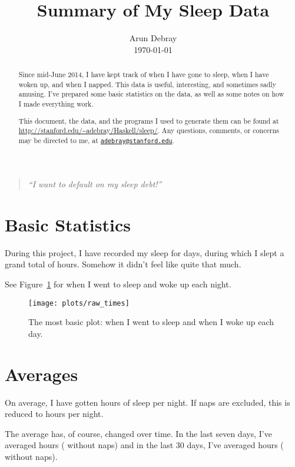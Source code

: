 \documentclass{amsart}
\begin{document}
\title{Summary of My Sleep Data}
\author{Arun Debray\\\today}
\maketitle

\begin{quote}\textit{
``I want to default on my sleep debt!''
}\end{quote}

\begin{abstract}
Since mid-June 2014, I have kept track of when I have gone to sleep, when I have woken up, and when I napped. This data is useful, interesting, and sometimes sadly amusing. I've prepared some basic statistics on the data, as well as some notes on how I made everything work.

This document, the data, and the programs I used to generate them can be found at \url{http://stanford.edu/~adebray/Haskell/sleep/}. Any questions, comments, or concerns may be directed to me, at \href{mailto:adebray@stanford.edu}{\texttt{adebray@stanford.edu}}.
\end{abstract}

\section{Basic Statistics}
During this project, I have recorded my sleep for  days, during which I slept a grand total of  hours. Somehow it didn't feel like quite that much.

See Figure~\ref{raw_data} for when I went to sleep and woke up each night.
\begin{figure}[h!]
	\centering
	\label{raw_data}
	\texttt{[image: plots/raw\_times]}
	\caption{The most basic plot: when I went to sleep and when I woke up each day.}
\end{figure}

\section{Averages}
On average, I have gotten  hours of sleep per night. If naps are excluded, this is reduced to  hours per night.

The average has, of course, changed over time. In the last seven days, I've averaged  hours ( without naps) and in the last 30 days, I've averaged  hours ( without naps). %
\end{document}
